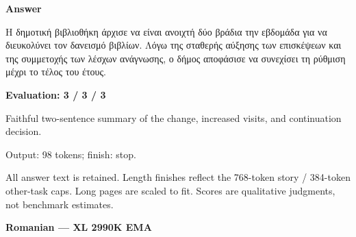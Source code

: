 \documentclass[10pt]{article}
\begin{document}
{\begin{minipage}{\textwidth}
\textbf{Answer}\par Η δημοτική βιβλιοθήκη άρχισε να είναι ανοιχτή δύο βράδια την εβδομάδα για να διευκολύνει τον δανεισμό βιβλίων. Λόγω της σταθερής αύξησης των επισκέψεων και της συμμετοχής των λέσχων ανάγνωσης, ο δήμος αποφάσισε να συνεχίσει τη ρύθμιση μέχρι το τέλος του έτους.\par\smallskip
\textbf{Evaluation: 3 / 3 / 3}\par Faithful two-sentence summary of the change, increased visits, and continuation decision.
\par {\color{gray} Output: 98 tokens; finish: stop.}\par
\medskip\footnotesize All answer text is retained. Length finishes reflect the 768-token story / 384-token other-task caps. Long pages are scaled to fit. Scores are qualitative judgments, not benchmark estimates.
\end{minipage}}%
\noindent\ifdim\dimexpr\ht\languagepage+\dp\languagepage\relax>0.93\textheight%
\resizebox*{!}{0.93\textheight}{\usebox{\languagepage}}%
\else\usebox{\languagepage}\fi%
\clearpage
{\Large\bfseries Romanian --- XL 2990K EMA}\par\smallskip
\end{document}
